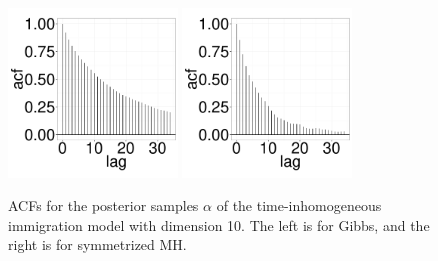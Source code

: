 {  \begin{figure}[H]
  \centering
  \begin{minipage}[!hp]{0.99\linewidth}
    \includegraphics [width=0.40\textwidth, angle=0]{figs/QC_ks/qc_gbsacf_4_03_10_.pdf}
	\hspace{.5in}
    \includegraphics [width=0.40\textwidth, angle=0]{figs/QC_ks/qc_mhacf_4_03_10_.pdf}
  \end{minipage}

    \caption{ACFs for the posterior samples $\alpha$ of the time-inhomogeneous immigration model with dimension 10. The left is for Gibbs, and the right is for symmetrized MH.}
     \label{fig:ACF_CQ}
  \end{figure}

}
